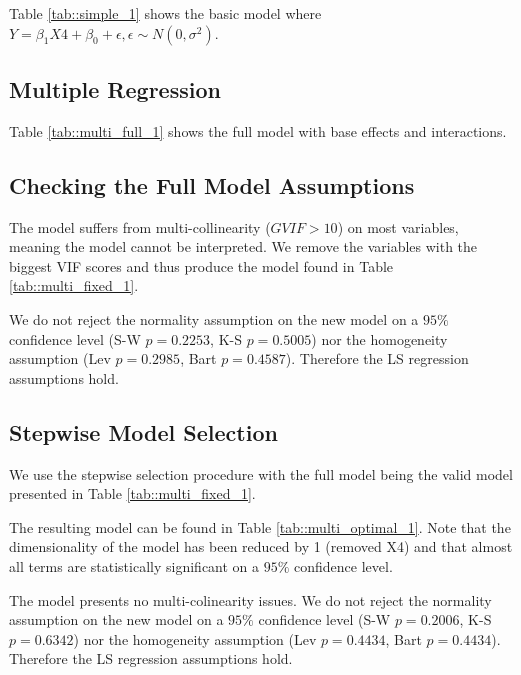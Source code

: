 \documentclass[12pt, a4paper]{article}
\begin{document}
	Table \ref{tab::simple_1} shows the basic model where $Y = \beta_1 X4 + \beta_0 + \epsilon, \epsilon \sim N(0, \sigma^2)$.
	
	
	
	
	\subsection{Multiple Regression}
	
	Table \ref{tab::multi_full_1} shows the full model  with base effects and interactions.
	
	
	
	
	\subsection{Checking the Full Model Assumptions}
	
	The model suffers from multi-collinearity ($GVIF > 10$) on most variables, meaning the model cannot be interpreted. We remove the variables with the biggest VIF scores and thus produce the model found in Table \ref{tab::multi_fixed_1}.
	
	We do not reject the normality assumption on the new model on a $95\%$ confidence level (S-W $p=0.2253$, K-S $p=0.5005$) nor the homogeneity assumption (Lev $p=0.2985$, Bart $p=0.4587$). Therefore the LS regression assumptions hold.
	
 	
 	
 	
 	\subsection{Stepwise Model Selection}
	
	We use the stepwise selection procedure with the full model being the valid model presented in Table \ref{tab::multi_fixed_1}.
	
	The resulting model can be found in Table \ref{tab::multi_optimal_1}. Note that the dimensionality of the model has been reduced by 1 (removed X4) and that almost all terms are statistically significant on a $95\%$ confidence level.
	
	The model presents no multi-colinearity issues. We do not reject the normality assumption on the new model on a $95\%$ confidence level (S-W $p=0.2006$, K-S $p=0.6342$) nor the homogeneity assumption (Lev $p=0.4434$, Bart $p=0.4434$). Therefore the LS regression assumptions hold.
	
	
	
\end{document}
